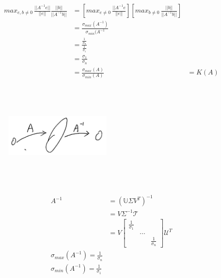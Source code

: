 \begin{align*}
max_{e,b\neq 0} \, \frac{||A^{-1}e||}{||e||} \frac{||b||}{||A^{-1}b||} &= \left[max_{e\neq 0}\, \frac{||A^{-1}e}{||e||}\right]\left[max_{b\neq 0}\, \frac{||b||}{||A^{-1}b||}\right]\\
&= \frac{\sigma_{max}(A^{-1})}{\sigma_{min}(A^{-1}}\\
&= \frac{\frac{1}{\sigma_n}}{\frac{1}{\sigma_1}}\\
&= \frac{\sigma_1}{\sigma_n}\\
&= \frac{\sigma_{max}(A)}{\sigma_{min}(A)}
&= K(A)
\end{align*}

\begin{figure}
	\centering
	\includegraphics[width=2.1in,height=2.1in]{figures/ch05/figure2.jpg}
\end{figure}

\begin{align}
A^{-1} &= (\mathbb{U}\Sigma V^T)^{-1} \\
&= V\Sigma^{-1}\mathcal{T}\\
&= V
\begin{bmatrix}
\frac{1}{\sigma_1} & &\\
& ... & \\
& & \frac{1}{\sigma_n}
\end{bmatrix}
\mathcal{U}^T\\
\sigma_{max}(A^{-1}) = \frac{1}{\sigma_n}\\
\sigma_{min}(A^{-1}) = \frac{1}{\sigma_1}
\end{align}
